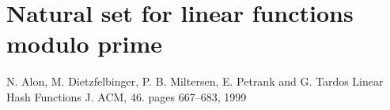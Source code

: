\documentclass{article}
\begin{document}
\section{Natural set for linear functions modulo prime}

\begin{thebibliography}{32}
N. Alon, M. Dietzfelbinger, P. B. Miltersen, E. Petrank and G. Tardos
\newblock Linear Hash Functions
\newblock J. {ACM}, 46. pages 667--683, 1999





\end{thebibliography}
\end{document}
